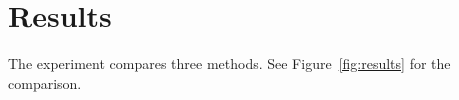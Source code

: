 \documentclass{article}
\begin{document}
\section{Results}
The experiment compares three methods.
See Figure~\ref{fig:results} for the comparison.
\end{document}
